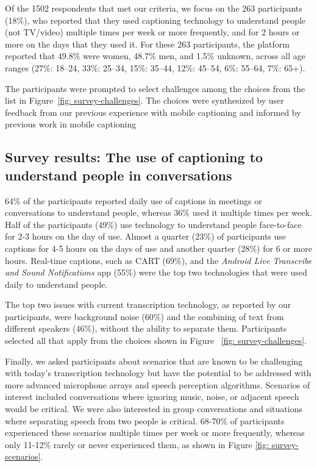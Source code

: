 Of the 1502 respondents that met our criteria, we focus on the 263 participants (18\%), who reported that they used captioning technology to understand people (not TV/video) multiple times per week or more frequently, and for 2 hours or more on the days that they used it. For these 263 participants, the platform reported that 49.8\% were women, 48.7\% men, and 1.5\% unknown, across all age ranges (27\%: 18--24, 33\%: 25--34, 15\%: 35--44, 12\%: 45--54, 6\%: 55--64, 7\%: 65+). 

The participants were prompted to select challenges among the choices from the list in Figure~\ref{fig: survey-challenges}. The choices were synthesized by user feedback from our previous experience with mobile captioning and informed by previous work in mobile captioning~\cite{localization_glasses, wearable_subtitle}

\subsection{Survey results: The use of captioning to understand people in conversations}
64\% of the participants reported daily use of captions in meetings or conversations to understand people, whereas 36\% used it multiple times per week. Half of the participants (49\%) use technology to understand people face-to-face for 2-3 hours on the day of use. Almost a quarter (23\%) of participants use captions for 4-5 hours on the days of use and another quarter (28\%) for 6 or more hours. Real-time captions, such as CART (69\%), and the \emph{Android Live Transcribe and Sound Notifications} app (55\%) were the top two technologies that were used daily to understand people.  %


The top two issues with current transcription technology, as reported by our participants, were background noise (60\%) and the combining of text from different speakers (46\%), without the ability to separate them. Participants selected all that apply from the choices shown in Figure ~\ref{fig: survey-challenges}.

Finally, we asked participants about scenarios that are known to be challenging with today's transcription technology but have the potential to be addressed with more advanced microphone arrays and speech perception algorithms. Scenarios of interest included conversations where ignoring music, noise, or adjacent speech would be critical. We were also interested in group conversations and situations where separating speech from two people is critical. 68-70\% of participants experienced these scenarios multiple times per week or more frequently, whereas only 11-12\% rarely or never experienced them, as shown in Figure \ref{fig: survey-scenarios}.

